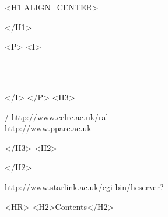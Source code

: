 \begin{htmlonly}
   \xlabel{}
   \begin{rawhtml} <H1 ALIGN=CENTER> \end{rawhtml}
      \stardoctitle
   \begin{rawhtml} </H1> \end{rawhtml}

   \begin{center}
   \end{center}

   \begin{rawhtml} <P> <I> \end{rawhtml}
   \stardoccategory\ \stardocnumber \\
   \stardocauthors \\
   \stardocdate
   \begin{rawhtml} </I> </P> <H3> \end{rawhtml}
       /
                        {http://www.cclrc.ac.uk/ral} \\
                        {http://www.pparc.ac.uk} \\
   \begin{rawhtml} </H3> <H2> \end{rawhtml}
   \begin{rawhtml} </H2> \end{rawhtml}
      {http://www.starlink.ac.uk/cgi-bin/hcserver?\stardocsource}\\

  \label{stardoccontents}
  \begin{rawhtml}
    <HR>
    <H2>Contents</H2>
  \end{rawhtml}
  \newcommand{\latexonlytoc}[0]{}

\end{htmlonly}

